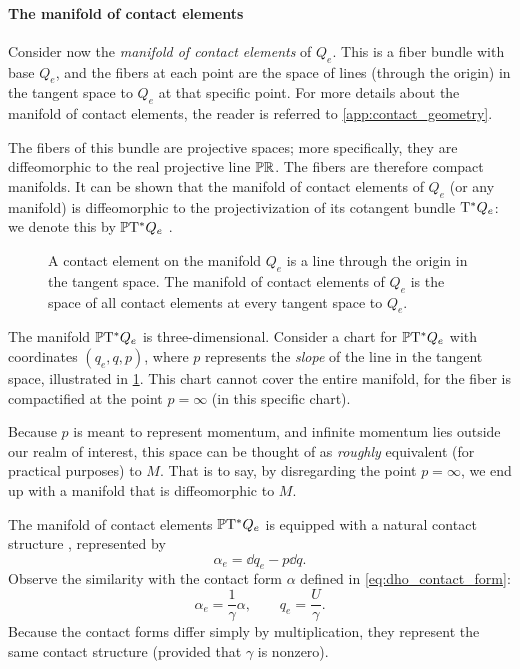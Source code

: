 \paragraph{The manifold of contact elements} Consider now the \emph{manifold of contact elements} of \(Q_e\). This is a fiber bundle with base \(Q_e\), and the fibers at each point are the space of lines (through the origin) in the tangent space to \(Q_e\) at that specific point. For more details about the manifold of contact elements, the reader is referred to \cref{app:contact_geometry}.

The fibers of this bundle are projective spaces; more specifically, they are diffeomorphic to the real projective line \(\mathbb{P}\mathbb{R}\). The fibers are therefore compact manifolds. It can be shown that the manifold of contact elements of \(Q_e\) (or any manifold) is diffeomorphic to the projectivization of its cotangent bundle $\mathrm{T}^*Q_e$: we denote this by \(\mathbb{P}\mathrm{T}^* Q_e\) \cite{Cannas2001,Arnold1989,Libermann1987}.

\begin{figure}
    \centering
    
    \caption{A contact element on the manifold \(Q_e\) is a line through the origin in the tangent space. The manifold of contact elements of \(Q_e\) is the space of all contact elements at every tangent space to \(Q_e\).}
    \label{fig:manifold_contact_elements}
\end{figure}

The manifold \(\mathbb{P}\mathrm{T}^* Q_e\) is three-dimensional. Consider a chart for \(\mathbb{P}\mathrm{T}^* Q_e\) with coordinates \( (q_e, q, p) \),
where \(p\) represents the \emph{slope} of the line in the tangent space, illustrated in \cref{fig:manifold_contact_elements}. This chart cannot cover the entire manifold, for the fiber is compactified at the point \(p = \infty\) (in this specific chart). 

Because \(p\) is meant to represent momentum, and infinite momentum lies outside our realm of interest, this space can be thought of as \emph{roughly} equivalent (for practical purposes) to \(M\). That is to say, by disregarding the point \(p = \infty\), we end up with a manifold that is diffeomorphic to \(M\).

The manifold of contact elements \(\mathbb{P}\mathrm{T}^* Q_e\) is equipped with a natural contact structure \cite{Arnold1989}, represented by
\begin{equation}
    \alpha_e = \dd{q}_e - p\dd{q}.
\end{equation}
Observe the similarity with the contact form \(\alpha\) defined in \cref{eq:dho_contact_form}: 
\begin{equation}
     \alpha_e = \frac{1}{\gamma}\alpha, \qquad q_e = \frac{U}{\gamma}.
\end{equation}
Because the contact forms differ simply by multiplication, they represent the same contact structure (provided that \(\gamma\) is nonzero).

